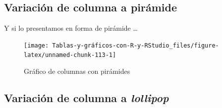 \documentclass[
]{book}
\newenvironment{Shaded}{\begin{snugshade}}{\end{snugshade}}
\newcommand{\AttributeTok}[1]{\textcolor[rgb]{0.77,0.63,0.00}{#1}}
\newcommand{\ConstantTok}[1]{\textcolor[rgb]{0.00,0.00,0.00}{#1}}
\newcommand{\FunctionTok}[1]{\textcolor[rgb]{0.00,0.00,0.00}{#1}}
\newcommand{\NormalTok}[1]{#1}
\newcommand{\SpecialCharTok}[1]{\textcolor[rgb]{0.00,0.00,0.00}{#1}}
\newcommand{\StringTok}[1]{\textcolor[rgb]{0.31,0.60,0.02}{#1}}
\begin{document}
\hypertarget{variaciuxf3n-de-columna-a-piruxe1mide}{%
\subsection{Variación de columna a pirámide}\label{variaciuxf3n-de-columna-a-piruxe1mide}}

Y si lo presentamos en forma de pirámide \ldots{}

\begin{Shaded}
\end{Shaded}

\begin{figure}[H]

{\centering \texttt{[image: Tablas-y-gráficos-con-R-y-RStudio\_files/figure-latex/unnamed-chunk-113-1]} 

}

\caption{Gráfico de columnas con pirámides}\label{fig:unnamed-chunk-113}
\end{figure}

\hypertarget{variaciuxf3n-de-columna-a-lollipop}{%
\subsection{\texorpdfstring{Variación de columna a \emph{lollipop}}{Variación de columna a lollipop}}\label{variaciuxf3n-de-columna-a-lollipop}}
\end{document}
